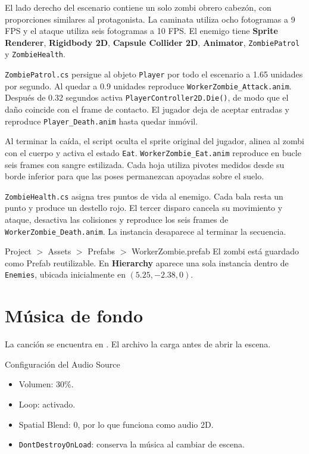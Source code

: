 \documentclass[11pt,a4paper]{article}
\newcommand{\component}[1]{\textbf{\textcolor{metalBlue}{#1}}}
\begin{document}
El lado derecho del escenario contiene un solo zombi obrero cabezón, con proporciones similares al protagonista. La caminata utiliza ocho fotogramas a 9 FPS y el ataque utiliza seis fotogramas a 10 FPS. El enemigo tiene \component{Sprite Renderer}, \component{Rigidbody 2D}, \component{Capsule Collider 2D}, \component{Animator}, \texttt{ZombiePatrol} y \texttt{ZombieHealth}.

\texttt{ZombiePatrol.cs} persigue al objeto \texttt{Player} por todo el escenario a 1.65 unidades por segundo. Al quedar a 0.9 unidades reproduce \texttt{WorkerZombie\_Attack.anim}. Después de 0.32 segundos activa \texttt{PlayerController2D.Die()}, de modo que el daño coincide con el frame de contacto. El jugador deja de aceptar entradas y reproduce \texttt{Player\_Death.anim} hasta quedar inmóvil.

Al terminar la caída, el script oculta el sprite original del jugador, alinea al zombi con el cuerpo y activa el estado \texttt{Eat}. \texttt{WorkerZombie\_Eat.anim} reproduce en bucle seis frames con sangre estilizada. Cada hoja utiliza pivotes medidos desde su borde inferior para que las poses permanezcan apoyadas sobre el suelo.

\texttt{ZombieHealth.cs} asigna tres puntos de vida al enemigo. Cada bala resta un punto y produce un destello rojo. El tercer disparo cancela su movimiento y ataque, desactiva las colisiones y reproduce los seis frames de \texttt{WorkerZombie\_Death.anim}. La instancia desaparece al terminar la secuencia.

\begin{unitybox}{Project $>$ Assets $>$ Prefabs $>$ WorkerZombie.prefab}
El zombi está guardado como Prefab reutilizable. En \textbf{Hierarchy} aparece una sola instancia dentro de \texttt{Enemies}, ubicada inicialmente en $(5.25,-2.38,0)$.
\end{unitybox}

\section{Música de fondo}

La canción se encuentra en . El archivo  la carga antes de abrir la escena.

\begin{gamebox}{Configuración del Audio Source}
\begin{itemize}
  \item Volumen: 30\%.
  \item Loop: activado.
  \item Spatial Blend: 0, por lo que funciona como audio 2D.
  \item \texttt{DontDestroyOnLoad}: conserva la música al cambiar de escena.
\end{itemize}
\end{gamebox}
\end{document}
